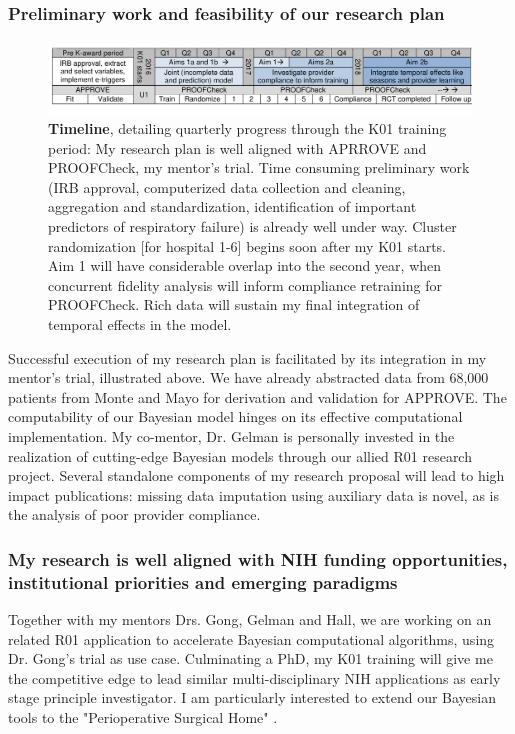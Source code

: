 \documentclass[11pt,notitlepage]{article}
\begin{document}
\subsubsection*{Preliminary work and feasibility of our research plan }

\begin{figure}[h]
 \vspace{-25pt}
 \centering
   \includegraphics[scale=1]{Figures/Timeline.pdf}  
 \vspace{-35pt}
 \caption*{\footnotesize \textbf{Timeline}, detailing quarterly progress through the K01 training period: My research plan is well aligned with APRROVE and PROOFCheck, my mentor's trial. Time consuming preliminary work (IRB approval, computerized data collection and cleaning, aggregation and standardization, identification of important predictors of respiratory failure) is already well under way. Cluster randomization [for hospital 1-6] begins soon after my K01 starts. Aim 1 will have considerable overlap into the second year, when concurrent fidelity analysis will inform compliance retraining for PROOFCheck. Rich data will sustain my final integration of temporal effects in the model.}
  \vspace{-10pt}
  \label{fig:Timeline}
 \end{figure}
 
Successful execution of my research plan is facilitated by its integration in my mentor's trial, illustrated above. We have already abstracted data from 68,000 patients from Monte and Mayo for derivation and validation for APPROVE. The computability of our Bayesian model hinges on its effective computational implementation. My co-mentor, Dr. Gelman is personally invested in the realization of cutting-edge Bayesian models through our allied R01 research project. Several standalone components of my research proposal will lead to high impact publications: missing data imputation using auxiliary data is novel, as is the analysis of poor provider compliance. 

\subsubsection*{My research is well aligned with NIH funding opportunities, institutional priorities and emerging paradigms}
Together with my mentors Drs. Gong, Gelman and Hall, we are working on an related R01 application to accelerate Bayesian computational algorithms, using Dr. Gong's trial as use case. Culminating a PhD, my K01 training will give me the competitive edge to lead similar multi-disciplinary NIH applications as early stage principle investigator. I am particularly interested to extend our Bayesian tools to the "Perioperative Surgical Home" \cite{Vetter_24781579}.
\end{document}
